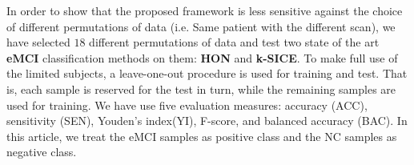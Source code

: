 \documentclass[journal]{IEEEtran}
\begin{document}
	In order to show that the proposed framework is less sensitive against the choice of different permutations of data (i.e. Same patient with the different scan), we have selected $18$ different permutations of data and test two state of the art \textbf{eMCI} classification methods on them: \textbf{HON}\cite{r14a} and \textbf{k-SICE}\cite{r14}.   
	To make full use of the limited subjects, a leave-one-out procedure is used for training and test. That is, each sample is reserved for the test in turn, while the remaining samples are used for training.
	We have use five
	evaluation measures: accuracy (ACC), sensitivity (SEN), Youden’s index(YI), F-score, and balanced accuracy (BAC).
	In this article, we treat the eMCI samples as positive class and the NC samples as negative class.
	
	
\end{document}
